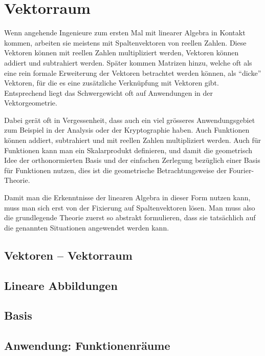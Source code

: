 %
%
%
\chapter{Vektorraum}
Wenn angehende Ingenieure zum ersten Mal mit linearer Algebra in
Kontakt kommen, arbeiten sie meistens mit Spaltenvektoren von
reellen Zahlen.
Diese Vektoren können mit reellen Zahlen multipliziert werden,
Vektoren können addiert und subtrahiert werden.
Später kommen Matrizen hinzu, welche oft als eine rein formale
Erweiterung der Vektoren betrachtet werden können, als ``dicke''
Vektoren, für die es eine zusätzliche Verknüpfung mit Vektoren
gibt.
Entsprechend liegt das Schwergewicht oft auf Anwendungen in der
Vektorgeometrie.

Dabei gerät oft in Vergessenheit, dass auch ein viel grösseres
Anwendungsgebiet zum Beispiel in der Analysis oder der Kryptographie
haben.
Auch Funktionen können addiert, subtrahiert und mit reellen Zahlen
multipliziert werden.
Auch für Funktionen kann man ein Skalarprodukt definieren, und
damit die geometrisch Idee der orthonormierten Basis und der
einfachen Zerlegung bezüglich einer Basis für Funktionen nutzen,
dies ist die geometrische Betrachtungsweise der Fourier-Theorie.

Damit man die Erkenntnisse der linearen Algebra in dieser Form
nutzen kann, muss man sich erst von der Fixierung auf Spaltenvektoren
lösen.
Man muss also die grundlegende Theorie zuerst so abstrakt formulieren,
dass sie tatsächlich auf die genannten Situationen angewendet werden 
kann.




\section{Vektoren -- Vektorraum}

\section{Lineare Abbildungen}

\section{Basis}

\section{Anwendung: Funktionenräume}



